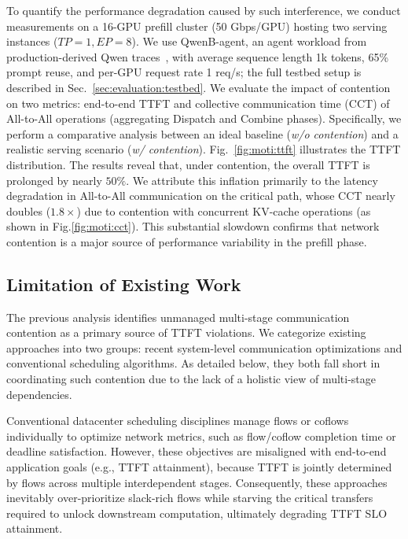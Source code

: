 

To quantify the performance degradation caused by such interference, we conduct measurements on a 16-GPU prefill cluster (50 Gbps/GPU) hosting two serving instances ($TP=1, EP=8$). We use QwenB-agent, an agent workload from production-derived Qwen traces~\cite{qwen_bailian_traces}, with average sequence length 1k tokens, 65\% prompt reuse, and per-GPU request rate 1 req/s; the full testbed setup is described in Sec.~\ref{sec:evaluation:testbed}. We evaluate the impact of contention on two metrics: end-to-end TTFT and collective communication time (CCT) of All-to-All operations (aggregating Dispatch and Combine phases). Specifically, we perform a comparative analysis between an ideal baseline (\textit{w/o contention}) and a realistic serving scenario (\textit{w/ contention}). Fig.~\ref{fig:moti:ttft} illustrates the TTFT distribution. The results reveal that, under contention, the overall TTFT is prolonged by nearly $50\%$. We attribute this inflation primarily to the latency degradation in All-to-All communication on the critical path, whose CCT nearly doubles ($1.8\times$) due to contention with concurrent KV-cache operations (as shown in Fig.\ref{fig:moti:cct}). This substantial slowdown confirms that network contention is a major source of performance variability in the prefill phase.

\subsection{Limitation of Existing Work}
The previous analysis identifies unmanaged multi-stage communication contention as a primary source of TTFT violations. We categorize existing approaches into two groups: recent system-level communication optimizations and conventional scheduling algorithms. As detailed below, they both fall short in coordinating such contention due to the lack of a holistic view of multi-stage dependencies.

 Conventional datacenter scheduling disciplines manage flows or coflows individually to optimize network metrics, such as flow/coflow completion time or deadline satisfaction. However, these objectives are misaligned with end-to-end application goals (e.g., TTFT attainment), because TTFT is jointly determined by flows across multiple interdependent stages. Consequently, these approaches inevitably over-prioritize slack-rich flows while starving the critical transfers required to unlock downstream computation, ultimately degrading TTFT SLO attainment.

